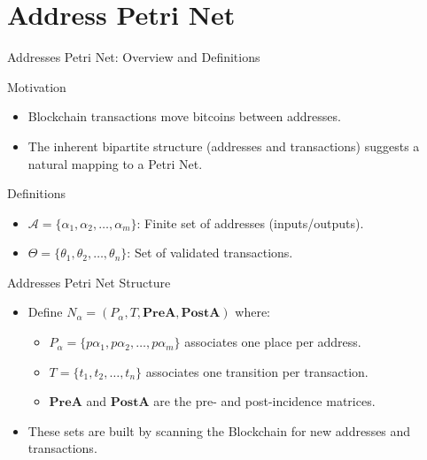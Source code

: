 \documentclass{beamer}
\begin{document}
\section{Address Petri Net}
\begin{frame}{Addresses Petri Net: Overview and Definitions}
    \footnotesize
    \begin{block}{Motivation}
        \begin{itemize}
            \item Blockchain transactions move bitcoins between addresses.
            \item The inherent bipartite structure (addresses and transactions) suggests a natural mapping to a Petri Net.
        \end{itemize}
    \end{block}

    \begin{block}{Definitions}
        \begin{itemize}
            \item \(\mathcal{A}=\{\alpha_1,\alpha_2,\dots,\alpha_m\}\): Finite set of addresses (inputs/outputs).
            \item \(\Theta=\{\theta_1,\theta_2,\dots,\theta_n\}\): Set of validated transactions.
        \end{itemize}
    \end{block}

    \begin{block}{Addresses Petri Net Structure}
        \begin{itemize}
            \item Define \(N_\alpha = (P_{\alpha}, T, \mathbf{PreA}, \mathbf{PostA})\) where:
                  \begin{itemize}
                      \item \(P_{\alpha} = \{p\alpha_1, p\alpha_2, \dots, p\alpha_m\}\) associates one place per address.
                      \item \(T = \{t_1, t_2, \dots, t_n\}\) associates one transition per transaction.
                      \item \(\mathbf{PreA}\) and \(\mathbf{PostA}\) are the pre- and post-incidence matrices.
                  \end{itemize}
            \item These sets are built by scanning the Blockchain for new addresses and transactions.
        \end{itemize}
    \end{block}
\end{frame}
\end{document}
